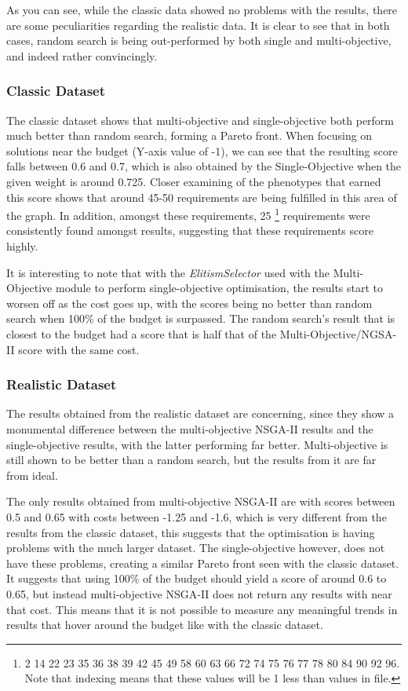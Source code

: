 \documentclass[11pt, a4paper]{article}
\begin{document}
As you can see, while the classic data showed no problems with the results,
there are some peculiarities regarding the realistic data. It is clear to see
that in both cases, random search is being out-performed by both single and
multi-objective, and indeed rather convincingly. 

\subsubsection{Classic Dataset} %
\label{ssub:classic_dataset}
The classic dataset shows that multi-objective and single-objective both perform
much better than random search, forming a Pareto front. When focusing on
solutions near the budget (Y-axis value of -1), we can see that the resulting
score falls between 0.6 and 0.7, which is also obtained by the Single-Objective
when the given weight is around 0.725. Closer examining of the phenotypes that
earned this score shows that around 45-50 requirements are being fulfilled in
this area of the graph. In addition, amongst these requirements, 25
\footnote{2 14 22 23 35 36 38 39 42 45 49 58 60 63 66 72 74 75 76 77 78 80 84 90
92 96. Note that indexing means that these values will be 1 less than values in
file.} requirements were consistently found amongst results, suggesting that
these requirements score highly.

It is interesting to note that with the \emph{ElitismSelector} used with the
Multi-Objective module to perform single-objective optimisation, the results
start to worsen off as the cost goes up, with the scores being no better than
random search when 100\% of the budget is surpassed. The random search's result
that is closest to the budget had a score that is half that of the
Multi-Objective/NGSA-II score with the same cost.

\subsubsection{Realistic Dataset} %
\label{ssub:realistic_dataset}
The results obtained from the realistic dataset are concerning, since they show
a monumental difference between the multi-objective NSGA-II results and the
single-objective results, with the latter performing far better. Multi-objective
is still shown to be better than a random search, but the results from it are
far from ideal.

The only results obtained from multi-objective NSGA-II are with scores between
0.5 and 0.65 with costs between -1.25 and -1.6, which is very different from the
results from the classic dataset, this suggests that the optimisation is having
problems with the much larger dataset. The single-objective however, does not
have these problems, creating a similar Pareto front seen with the classic
dataset. It suggests that using 100\% of the budget should yield a score of
around 0.6 to 0.65, but instead multi-objective NSGA-II does not return any
results with near that cost. This means that it is not possible to measure any
meaningful trends in results that hover around the budget like with the classic
dataset.
\end{document}
